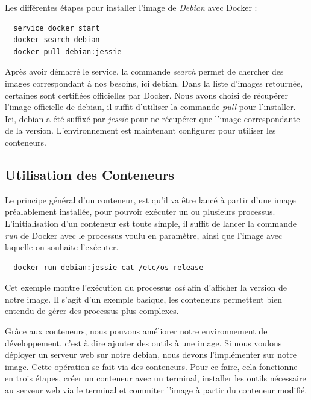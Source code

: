 \documentclass[12pt,a4paper]{article}
\begin{document}
Les différentes étapes pour installer l'image de \textit{Debian} avec Docker :
\begin{lstlisting}
  service docker start
  docker search debian
  docker pull debian:jessie
\end{lstlisting}

Après avoir démarré le service, la commande \textit{search} permet de chercher des images correspondant à nos besoins, ici debian. Dans la liste d'images retournée, certaines sont certifiées officielles par Docker. Nous avons choisi de récupérer l'image officielle de debian, il suffit d'utiliser la commande \textit{pull} pour l'installer. Ici, debian a été suffixé par \textit{jessie} pour ne récupérer que l'image correspondante de la version. L'environnement est maintenant configurer pour utiliser les conteneurs.

\subsection{Utilisation des Conteneurs}

Le principe général d'un conteneur, est qu'il va être lancé à partir d'une image préalablement installée, pour pouvoir exécuter un ou plusieurs processus. L'initialisation d'un conteneur est toute simple, il suffit de lancer la commande \textit{run} de Docker avec le processus voulu en paramètre, ainsi que l'image avec laquelle on souhaite l'exécuter. 

\begin{lstlisting}
  docker run debian:jessie cat /etc/os-release
\end{lstlisting}
Cet exemple montre l'exécution du processus \textit{cat} afin d'afficher la version de notre image. Il s'agit d'un exemple basique, les conteneurs permettent bien entendu de gérer des processus plus complexes.

Grâce aux conteneurs, nous pouvons améliorer notre environnement de développement, c'est à dire ajouter des outils à une image. Si nous voulons déployer un serveur web sur notre debian, nous devons l'implémenter sur notre image. Cette opération se fait via des conteneurs. Pour ce faire, cela fonctionne en trois étapes, créer un conteneur avec un terminal, installer les outils nécessaire au serveur web via le terminal et commiter l'image à partir du conteneur modifié.
\end{document}
